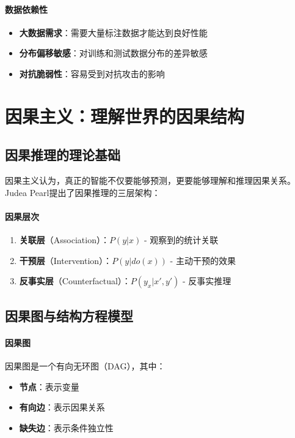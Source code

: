 \paragraph{数据依赖性}
\begin{itemize}
\item \textbf{大数据需求}：需要大量标注数据才能达到良好性能
\item \textbf{分布偏移敏感}：对训练和测试数据分布的差异敏感
\item \textbf{对抗脆弱性}：容易受到对抗攻击的影响
\end{itemize}

\section{因果主义：理解世界的因果结构}

\subsection{因果推理的理论基础}

因果主义认为，真正的智能不仅要能够预测，更要能够理解和推理因果关系。Judea Pearl提出了因果推理的三层架构：

\paragraph{因果层次}
\begin{enumerate}
\item \textbf{关联层}（Association）：$P(y|x)$ - 观察到的统计关联
\item \textbf{干预层}（Intervention）：$P(y|do(x))$ - 主动干预的效果
\item \textbf{反事实层}（Counterfactual）：$P(y_x|x', y')$ - 反事实推理
\end{enumerate}

\subsection{因果图与结构方程模型}

\paragraph{因果图}
因果图是一个有向无环图（DAG），其中：
\begin{itemize}
\item \textbf{节点}：表示变量
\item \textbf{有向边}：表示因果关系
\item \textbf{缺失边}：表示条件独立性
\end{itemize}

